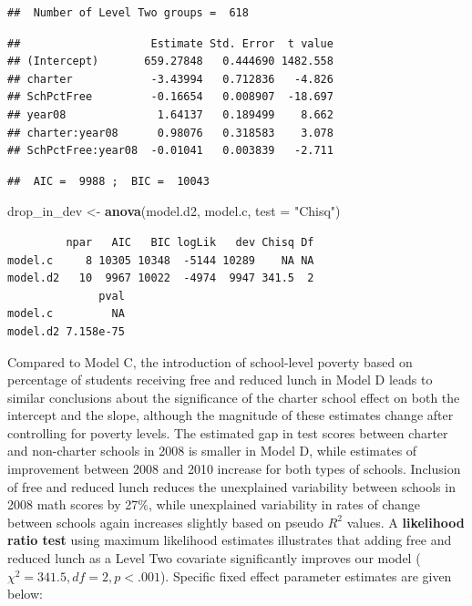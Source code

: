 \documentclass[
]{krantz}
\newenvironment{Shaded}{\begin{snugshade}}{\end{snugshade}}
\newcommand{\DataTypeTok}[1]{\textcolor[rgb]{0.27,0.27,0.27}{#1}}
\newcommand{\KeywordTok}[1]{\textcolor[rgb]{0.27,0.27,0.27}{\textbf{#1}}}
\newcommand{\NormalTok}[1]{#1}
\newcommand{\StringTok}[1]{\textcolor[rgb]{0.5,0.5,0.5}{#1}}
\begin{document}
\begin{verbatim}
##  Number of Level Two groups =  618
\end{verbatim}

\begin{verbatim}
##                    Estimate Std. Error  t value
## (Intercept)       659.27848   0.444690 1482.558
## charter            -3.43994   0.712836   -4.826
## SchPctFree         -0.16654   0.008907  -18.697
## year08              1.64137   0.189499    8.662
## charter:year08      0.98076   0.318583    3.078
## SchPctFree:year08  -0.01041   0.003839   -2.711
\end{verbatim}

\begin{verbatim}
##  AIC =  9988 ;  BIC =  10043
\end{verbatim}

\begin{Shaded}
\begin{Highlighting}[]
\NormalTok{drop_in_dev <-}\StringTok{ }\KeywordTok{anova}\NormalTok{(model.d2, model.c, }\DataTypeTok{test =} \StringTok{"Chisq"}\NormalTok{)}
\end{Highlighting}
\end{Shaded}

\begin{verbatim}
         npar   AIC   BIC logLik   dev Chisq Df
model.c     8 10305 10348  -5144 10289    NA NA
model.d2   10  9967 10022  -4974  9947 341.5  2
              pval
model.c         NA
model.d2 7.158e-75
\end{verbatim}

Compared to Model C, the introduction of school-level poverty based on percentage of students receiving free and reduced lunch in Model D leads to similar conclusions about the significance of the charter school effect on both the intercept and the slope, although the magnitude of these estimates change after controlling for poverty levels. The estimated gap in test scores between charter and non-charter schools in 2008 is smaller in Model D, while estimates of improvement between 2008 and 2010 increase for both types of schools. Inclusion of free and reduced lunch reduces the unexplained variability between schools in 2008 math scores by 27\%, while unexplained variability in rates of change between schools again increases slightly based on pseudo \(R^2\) values. A \textbf{likelihood ratio test} using maximum likelihood estimates illustrates that adding free and reduced lunch as a Level Two covariate significantly improves our model (\(\chi^2 = 341.5, df=2, p<.001\)). Specific fixed effect parameter estimates are given below:
\end{document}
